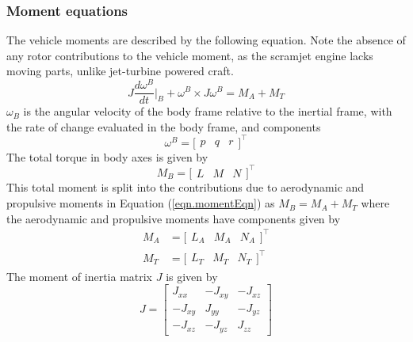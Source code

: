 \subsubsection{Moment equations}

The vehicle moments are described by the following equation.
Note the absence of any rotor contributions to the vehicle moment, as the scramjet engine lacks moving parts, unlike jet-turbine powered craft.
\begin{equation}
  \label{eqn.momentEqn}
  J\frac{d\omega^{B}}{dt}\biggr|_{B}+\omega^{B}\times J\omega^{B}=M_{A}+M_{T}
\end{equation}
$\omega_{B}$ is the angular velocity of the body frame relative to the inertial frame, with the rate of change evaluated in the body frame, and components
\begin{equation*}
  \omega^{B}=
  \bigr[
  \begin{array}{ccc}
    p & q & r
  \end{array}\bigr]^{\top}
\end{equation*}
The total torque in body axes is given by
\begin{equation*}
  M_{B}=
  \bigr[
  \begin{array}{ccc}
    L & M & N
  \end{array}\bigr]^{\top}
\end{equation*}
This total moment is split into the contributions due to aerodynamic and propulsive moments in Equation (\ref{eqn.momentEqn}) as $M_{B}=M_{A}+M_{T}$ where the aerodynamic and propulsive moments have components given by
\begin{equation}
  \label{eqn.AeroAndPropulsiveMoments}
  \begin{split}
    M_{A}&=
    \bigr[
    \begin{array}{ccc}
      L_{A} & M_{A} & N_{A}
    \end{array}\bigr]^{\top} \\
    M_{T}&=
    \bigr[
    \begin{array}{ccc}
      L_{T} & M_{T} & N_{T}
    \end{array}\bigr]^{\top}
  \end{split}
\end{equation}
The moment of inertia matrix $J$ is given by
\begin{equation*}
  J=
  \begin{bmatrix}
    J_{xx} & -J_{xy} & -J_{xz} \\
    -J_{xy} & J_{yy} & -J_{yz} \\
    -J_{xz} & -J_{yz} & J_{zz}
  \end{bmatrix}
\end{equation*}
